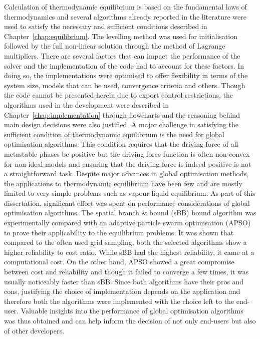 	Calculation of thermodynamic equilibrium is based on the fundamental laws of thermodynamics and several algorithms already reported in the literature were used to satisfy the necessary and sufficient conditions described in Chapter~\ref{chap:equilibrium}. The levelling method was used for initialisation followed by the full non-linear solution through the method of Lagrange multipliers. There are several factors that can impact the performance of the solver and the implementation of the code had to account for these factors. In doing so, the implementations were optimised to offer flexibility in terms of the system size, models that can be used, convergence criteria and others. Though the code cannot be presented herein due to export control restrictions, the algorithms used in the development were described in Chapter~\ref{chap:implementation} through flowcharts and the reasoning behind main design decisions were also justified. A major challenge in satisfying the sufficient condition of thermodynamic equilibrium is the need for global optimisation algorithms. This condition requires that the driving force of all metastable phases be positive but the driving force function is often non-convex for non-ideal models and ensuring that the driving force is indeed positive is not a straightforward task. Despite major advances in global optimisation methods, the applications to thermodynamic equilibrium have been few and are mostly limited to very simple problems such as vapour-liquid equilibrium. As part of this dissertation, significant effort was spent on performance considerations of global optimisation algorithms. The spatial branch \& bound (sBB) bound algorithm was experimentally compared with an adaptive particle swarm optimisation (APSO) to prove their applicability to the equilibrium problems. It was shown that compared to the often used grid sampling, both the selected algorithms show a higher reliability to cost ratio. While sBB had the highest reliability, it came at a computational cost. On the other hand, APSO showed a great compromise between cost and reliability and though it failed to converge a few times, it was usually noticeably faster than sBB. Since both algorithms have their pros and cons, justifying the choice of implementation depends on the application and therefore both the algorithms were implemented with the choice left to the end-user. Valuable insights into the performance of global optimisation algorithms was thus obtained and can help inform the decision of not only end-users but also of other developers.
	
